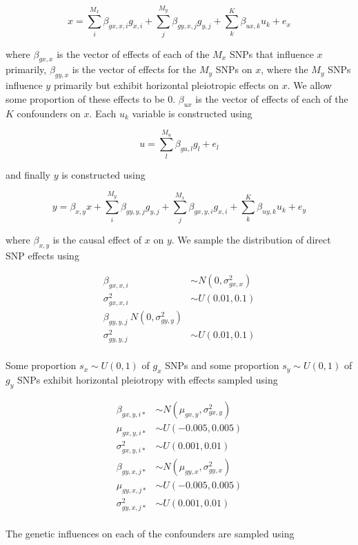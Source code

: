 \documentclass[]{article}
\begin{document}
\[
x = \sum^{M_x}_{i}{\beta_{gx,x,i}g_{x,i}} + \sum^{M_y}_{j}{\beta_{gy,x,j}g_{y,j}} + \sum^{K}_{k}{\beta_{ux,k} u_{k}} + e_{x}
\]

where \(\beta_{gx,x}\) is the vector of effects of each of the \(M_x\)
SNPs that influence \(x\) primarily, \(\beta_{gy,x}\) is the vector of
effects for the \(M_y\) SNPs on \(x\), where the \(M_y\) SNPs influence
\(y\) primarily but exhibit horizontal pleiotropic effects on \(x\). We
allow some proportion of these effects to be 0. \(\beta_{ux}\) is the
vector of effects of each of the \(K\) confounders on \(x\). Each
\(u_{k}\) variable is constructed using

\[
u = \sum^{M_u}_{l}{\beta_{gu,l}g_{l}} + e_{l}
\]

and finally \(y\) is constructed using

\[
y = \beta_{x,y}x + \sum^{M_y}_{i}{\beta_{gy,y,j}g_{y,j}} + \sum^{M_x}_{j}{\beta_{gx,y,i}g_{x,i}} + \sum^{K}_{k}{\beta_{uy,k} u_{k}} + e_{y}
\]

where \(\beta_{x,y}\) is the causal effect of \(x\) on \(y\). We sample
the distribution of direct SNP effects using

\[
\begin{aligned}
\beta_{gx,x,i} & \sim N(0, \sigma^2_{gx,x}) \\
\sigma^2_{gx,x,i} & \sim U(0.01, 0.1) \\
\beta_{gy,y,j} ~ N(0, \sigma^2_{gy,y}) \\
\sigma^2_{gy,y,j} & \sim U(0.01, 0.1) \\
\end{aligned}
\]

Some proportion \(s_x \sim U(0,1)\) of \(g_x\) SNPs and some proportion
\(s_y \sim U(0,1)\) of \(g_y\) SNPs exhibit horizontal pleiotropy with
effects sampled using

\[
\begin{aligned}
\beta_{gx,y,i*} & \sim N(\mu_{gx,y}, \sigma^2_{gx,y})  \\
\mu_{gx,y,i*} & \sim U(-0.005, 0.005) \\
\sigma^2_{gx,y,i*} & \sim U(0.001, 0.01) \\
\beta_{gy,x,j*} & \sim N(\mu_{gy,x}, \sigma^2_{gy,x}) \\
\mu_{gy,x,j*} & \sim U(-0.005, 0.005) \\
\sigma^2_{gy,x,j*} & \sim U(0.001, 0.01) \\
\end{aligned}
\]

The genetic influences on each of the confounders are sampled using
\end{document}
